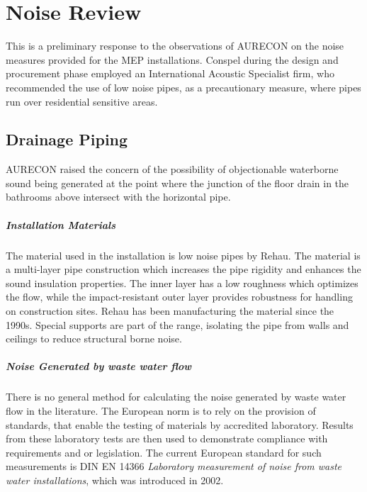 \pgfplotsset{compat/show suggested version=false}
\chapter{Noise Review}

This is a preliminary response to the observations of \textsc{AURECON} on the noise measures provided for the MEP installations. Conspel during the design and procurement phase employed an International Acoustic Specialist firm, who recommended the use of low noise pipes, as a precautionary measure, where pipes run over residential sensitive areas.

\section{Drainage Piping}

AURECON raised the concern of the possibility of objectionable waterborne sound being generated at the point where the junction of the floor drain in the bathrooms above intersect with the horizontal pipe.

\paragraph{Installation Materials}

The material used in the installation is low noise pipes by Rehau. The material is a multi-layer pipe construction which increases the pipe rigidity and enhances the sound insulation properties. The inner layer has a low roughness which optimizes the flow, while the impact-resistant outer layer provides robustness for handling on construction sites. Rehau has been manufacturing the material since the 1990s. Special supports are part of the range, isolating the pipe from walls and ceilings to reduce structural borne noise.

\paragraph{Noise Generated by waste water flow} There is no general method for calculating the noise generated by waste water flow in the literature. The European norm is to rely on the provision of standards, that enable the testing of materials by accredited laboratory. Results from these laboratory tests are then used to demonstrate compliance with requirements and or legislation.  The current European standard for such measurements is DIN EN 14366 \textit{Laboratory measurement of noise from waste water installations}, which was introduced in 2002.  

